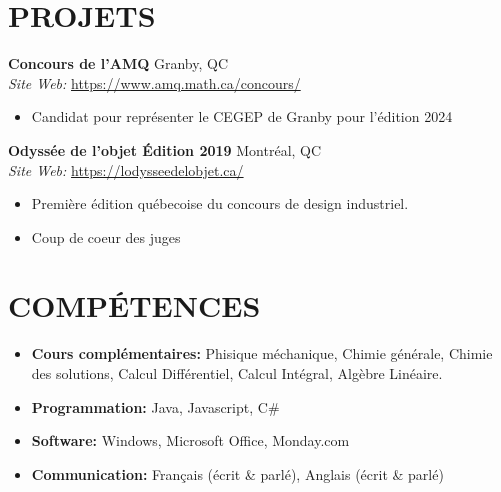 \documentclass[a4paper,9pt]{extarticle}
\begin{document}
\section*{PROJETS}
\noindent
\textbf{Concours de l'AMQ} \hfill Granby, QC\\ 
\textit{Site Web:} \url{https://www.amq.math.ca/concours/} \hfill 
\begin{itemize}
    \item Candidat pour représenter le CEGEP de Granby pour l'édition 2024
\end{itemize}

\noindent
\textbf{Odyssée de l'objet Édition 2019} \hfill Montréal, QC\\ 
\textit{Site Web:} \url{https://lodysseedelobjet.ca/} \hfill 
\begin{itemize}
    \item Première édition québecoise du concours de design industriel. 
    \item Coup de coeur des juges
\end{itemize}

\section*{COMPÉTENCES}
\begin{itemize}
    \item \textbf{Cours complémentaires: } Phisique méchanique, Chimie générale, Chimie des solutions, Calcul Différentiel, Calcul Intégral, Algèbre Linéaire. 
    \item \textbf{Programmation:} Java, Javascript, C\#
    \item \textbf{Software:} Windows, Microsoft Office, Monday.com 
    \item \textbf{Communication:} Français (écrit \& parlé), Anglais (écrit \& parlé) %
\end{itemize}

\end{document}
